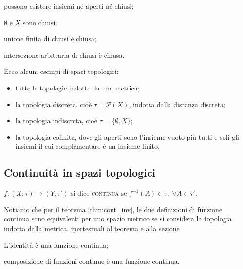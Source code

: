 \documentclass{article}
\begin{document}
\begin{oss}
\begin{nlist}
\item possono esistere insiemi né aperti né chiusi;
\item $\emptyset$ e $X$ sono chiusi;
\item unione finita di chiusi è chiusa;
\item intersezione arbitraria di chiusi è chiusa.
\end{nlist}
\end{oss}

\begin{ex}
Ecco alcuni esempi di spazi topologici:
\begin{itemize}
\item tutte le topologie indotte da una metrica;
\item la topologia discreta, cioè $\tau=\mathcal{P}(X)$, indotta dalla distanza
discreta;
\item la topologia indiscreta, cioè $\tau=\{ \emptyset, X \}$;
\item la topologia cofinita, dove gli aperti sono l'insieme vuoto più tutti e
soli gli insiemi il cui complementare è un insieme finito.
\end{itemize}
\end{ex}

\subsection{Continuità in spazi topologici}

\begin{defn}
$f: (X, \tau) \rightarrow (Y, \tau')$ si dice \textsc{continua} se ${f^{-1}(A)
\in \tau,}\; {\forall A \in \tau'}$.
\end{defn}

Notiamo che per il teorema \ref{thm:cont_inv}, le due
definizioni di funzione continua sono equivalenti per uno spazio metrico se si
considera la topologia indotta dalla metrica. %
ipertestuali al teorema e alla sezione

\begin{thm}
\begin{nlist}
\item L'identità è una funzione continua;
\item composizione di funzioni continue è una funzione continua.
\end{nlist}
\end{thm}
\end{document}
